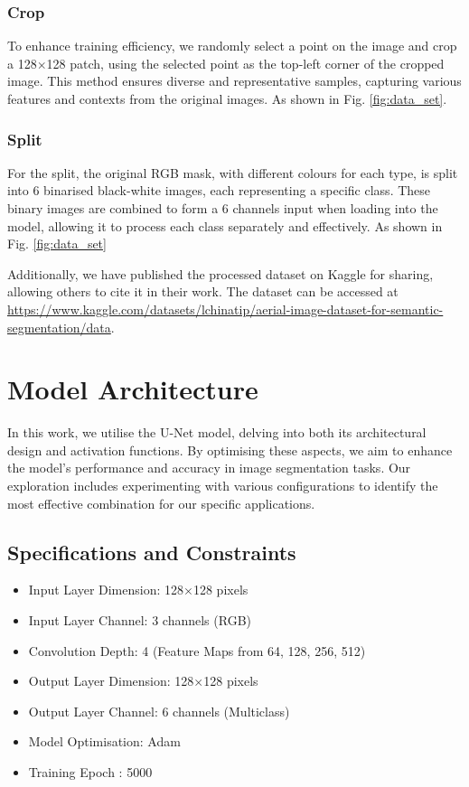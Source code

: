 \documentclass[conference]{IEEEtran}
\begin{document}
\subsubsection{Crop}
To enhance training efficiency, we randomly select a point on the image and crop a 128$\times$128 patch, using the selected point as the top-left corner of the cropped image. This method ensures diverse and representative samples, capturing various features and contexts from the original images. As shown in Fig. \ref{fig:data_set}.

\subsubsection{Split}
For the split, the original RGB mask, with different colours for each type, is split into 6 binarised black-white images, each representing a specific class. These binary images are combined to form a 6 channels input when loading into the model, allowing it to process each class separately and effectively. As shown in Fig. \ref{fig:data_set}

Additionally, we have published the processed dataset on Kaggle for sharing, allowing others to cite it in their work. The dataset can be accessed at \href{https://www.kaggle.com/datasets/lchinatip/aerial-image-dataset-for-semantic-segmentation/data}{https://www.kaggle.com/datasets/lchinatip/aerial-image-dataset-for-semantic-segmentation/data}.

\section{Model Architecture}

In this work, we utilise the U-Net model, delving into both its architectural design and activation functions. By optimising these aspects, we aim to enhance the model's performance and accuracy in image segmentation tasks. Our exploration includes experimenting with various configurations to identify the most effective combination for our specific applications.

\subsection{Specifications and Constraints}
\begin{itemize}
    \item Input Layer Dimension: 128$\times$128 pixels
    \item Input Layer Channel: 3 channels (RGB)
    \item Convolution Depth: 4 (Feature Maps from 64, 128, 256, 512)
    \item Output Layer Dimension: 128$\times$128 pixels
    \item Output Layer Channel: 6 channels (Multiclass)
    \item Model Optimisation: Adam
    \item Training Epoch : 5000
\end{itemize}
\end{document}
